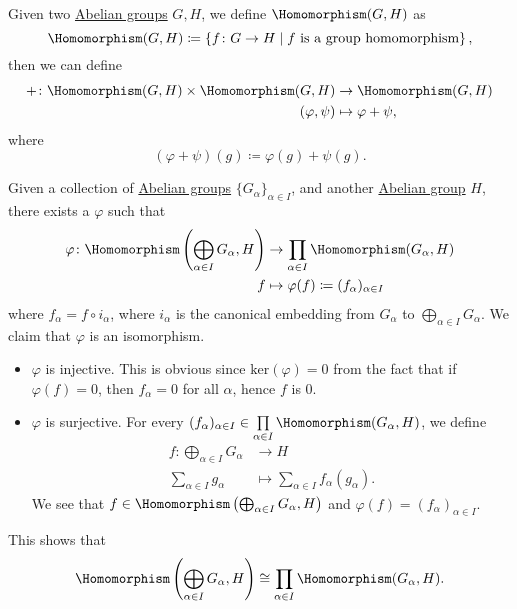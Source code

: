 \begin{definition}
	Given two \hyperref[def:Abelian-group]{Abelian groups} \(G, H\), we define \(\Homomorphism (G, H)\) as
	\[
		\Homomorphism (G, H) \coloneqq \left\{f\colon G\to H \mid \text{\(f\) is a group homomorphism} \right\},
	\]
	then we can define
	\[
		\begin{split}
			+\colon \Homomorphism (G, H)\times \Homomorphism (G, H) &\to \Homomorphism (G, H)\\
			(\varphi , \psi )&\mapsto \varphi + \psi,
		\end{split}
	\]
	where
	\[
		(\varphi + \psi )(g)\coloneqq \varphi (g) + \psi (g).
	\]
\end{definition}

\begin{remark}\label{rmk:relation-between-direct-sum-and-direct-product}
	Given a collection of \hyperref[def:Abelian-group]{Abelian groups} \(\{G_\alpha \}_{\alpha \in I}\), and another \hyperref[def:Abelian-group]{Abelian group} \(H\), there exists a
	\(\varphi \) such that
	\[
		\begin{split}
			\varphi \colon \Homomorphism \left(\bigoplus_{\alpha \in I}G_\alpha , H\right)&\to \prod\limits_{\alpha \in I}\Homomorphism (G_\alpha , H)\\
			f&\mapsto \varphi (f)\coloneqq (f_\alpha )_{\alpha \in I}
		\end{split}
	\]
	where \(f_\alpha = f\circ i_\alpha \), where \(i_\alpha \) is the canonical embedding from \(G_\alpha \) to \(\bigoplus_{\alpha \in I}G _\alpha \). We claim
	that \(\varphi \) is an isomorphism.

	\begin{itemize}
		\item \(\varphi \) is injective. This is obvious since \(\mathrm{ker} (\varphi ) = 0\) from the fact that if \(\varphi (f) = 0\), then \(f_\alpha  = 0\) for all \(\alpha\), hence
		      \(f\) is \(0\).
		\item \(\varphi \) is surjective. For every \((f_\alpha )_{\alpha \in I}\in \prod\limits_{\alpha \in I}\Homomorphism (G_\alpha , H) \), we define
		      \[
			      \begin{split}
				      f\colon \bigoplus_{\alpha \in I}G_\alpha &\to H\\
				      \sum\limits_{\alpha \in I}^{}g_\alpha &\mapsto \sum\limits_{\alpha \in I}f_\alpha (g_\alpha ).
			      \end{split}
		      \]
		      We see that \(f\in \Homomorphism \left(\bigoplus_{\alpha \in I}G_\alpha , H\right)\) and \(\varphi (f) = (f_\alpha )_{\alpha \in I}\).
	\end{itemize}

	This shows that
	\[
		\Homomorphism \left(\bigoplus_{\alpha \in I}G_\alpha , H\right)\cong \prod\limits_{\alpha \in I}\Homomorphism (G_\alpha , H).
	\]
\end{remark}

